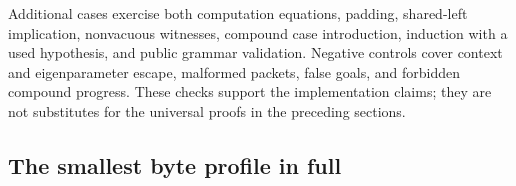 Additional cases exercise both computation equations, padding,
shared-left implication, nonvacuous witnesses, compound case
introduction, induction with a used hypothesis, and public grammar
validation.  Negative controls cover context and eigenparameter
escape, malformed packets, false goals, and forbidden compound
progress.  These checks support the implementation claims; they
are not substitutes for the universal proofs in the preceding sections.

\subsection{The smallest byte profile in full}



